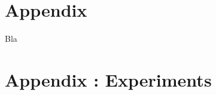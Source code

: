 
\clearpage

\thesisappendix

\section{Appendix \label{A}}

Bla

\clearpage
\section{Appendix \label{B}: Experiments}



